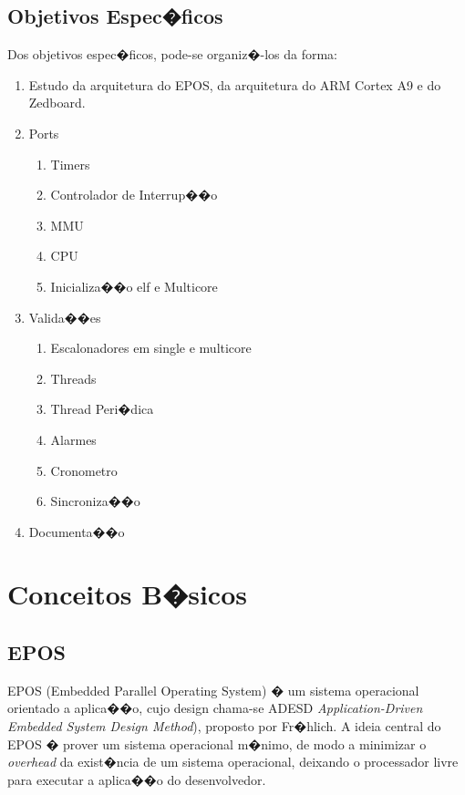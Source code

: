 \documentclass{ufscThesis/ufscThesis} %
\begin{document}
\section{Objetivos Espec�ficos}
Dos objetivos espec�ficos, pode-se organiz�-los da forma:

\begin{enumerate}
    \item Estudo da arquitetura do EPOS, da arquitetura do ARM Cortex A9 e do Zedboard.
    \item Ports
    \begin{enumerate}
        \item Timers
        \item Controlador de Interrup��o
        \item MMU
        \item CPU
        \item Inicializa��o elf e Multicore
    \end{enumerate}
    \item Valida��es
    \begin{enumerate}
        \item Escalonadores em single e multicore
        \item Threads
        \item Thread Peri�dica
        \item Alarmes
        \item Cronometro
        \item Sincroniza��o
    \end{enumerate}
    \item Documenta��o
\end{enumerate}

\chapter{Conceitos B�sicos}

\section{EPOS}

EPOS (Embedded Parallel Operating System) � um sistema operacional orientado a aplica��o, cujo design chama-se ADESD \emph{Application-Driven Embedded System Design Method}), proposto por Fr�hlich. A ideia central do EPOS � prover um sistema operacional m�nimo, de modo a minimizar o \emph{overhead} da exist�ncia de um sistema operacional, deixando o processador livre para executar a aplica��o do desenvolvedor\cite{epos_user_guide}.
\end{document}
